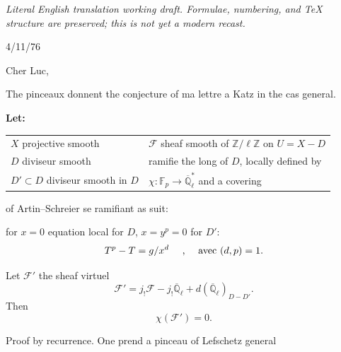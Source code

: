 \documentclass[11pt,a4paper]{article}
\theoremstyle{plain}
\theoremstyle{definition}
\begin{document}
\begin{center}\small\emph{Literal English translation working draft. Formulae, numbering, and TeX structure are preserved; this is not yet a modern recast.}\end{center}
\vspace{0.5em}


\begin{flushright}
4/11/76
\end{flushright}

\vspace{0.5cm}

\noindent Cher Luc,

\vspace{0.5cm}

The pinceaux donnent the conjecture of ma lettre a Katz in the cas general.

\vspace{0.3cm}

\noindent\textbf{Let:}
\begin{center}
\begin{tabular}{p{5cm}p{7cm}}
$X$ projective smooth & $\mathcal{F}$ sheaf smooth of $\mathbb{Z}/\ell\mathbb{Z}$ on $U = X - D$ \\
$D$ diviseur smooth & ramifie the long of $D$, locally defined by \\
$D' \subset D$ diviseur smooth in $D$ & $\chi : \mathbb{F}_p \to \overline{\mathbb{Q}}_\ell^*$ and a covering \\
\end{tabular}
\end{center}

of Artin--Schreier se ramifiant as suit:
\begin{center}
for $x = 0$ equation local for $D$, \quad $x = y^p = 0$ for $D'$:
\[
T^p - T = g/x^d \text{ \quad , \quad avec } (d,p) = 1.
\]
\end{center}

\vspace{0.3cm}

Let $\mathcal{F}'$ the sheaf virtuel
\[
\mathcal{F}' = j_! \mathcal{F} - j_! \overline{\mathbb{Q}}_\ell + d(\overline{\mathbb{Q}}_\ell)_{D-D'}.
\]
Then
\[
\chi(\mathcal{F}') = 0.
\]

Proof by recurrence. One prend a pinceau of Lefschetz general
\end{document}
